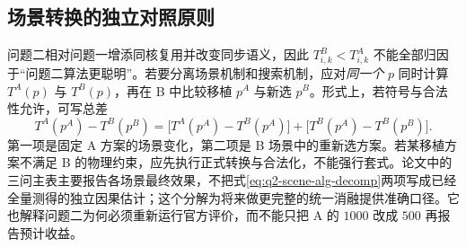 \subsection{场景转换的独立对照原则}
问题二相对问题一增添同核复用并改变同步语义，因此 $T^B_{i,k}<T^A_{i,k}$ 不能全部归因于“问题二算法更聪明”。若要分离场景机制和搜索机制，应对\emph{同一个} $p$ 同时计算 $T^A(p)$ 与 $T^B(p)$，再在 B 中比较移植 $p^A$ 与新选 $p^B$。形式上，若符号与合法性允许，可写总差
\begin{equation}\label{eq:q2-scene-alg-decomp}
T^A(p^A)-T^B(p^B)=
\bigl[T^A(p^A)-T^B(p^A)\bigr]
+\bigl[T^B(p^A)-T^B(p^B)\bigr].
\end{equation}
第一项是固定 A 方案的场景变化，第二项是 B 场景中的重新选方案。若某移植方案不满足 B 的物理约束，应先执行正式转换与合法化，不能强行套式。论文中的三问主表主要报告各场景最终效果，不把式\eqref{eq:q2-scene-alg-decomp}两项写成已经全量测得的独立因果估计；这个分解为将来做更完整的统一消融提供准确口径。它也解释问题二为何必须重新运行官方评价，而不能只把 A 的 $1000$ 改成 $500$ 再报告预计收益。
